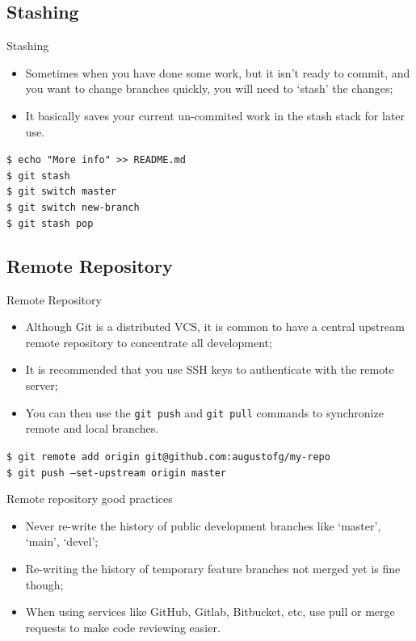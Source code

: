 \documentclass{beamer}
\begin{document}
\subsection{Stashing}
\begin{frame}{Stashing}
  \begin{itemize}
    \item Sometimes when you have done some work, but it isn't ready to commit, and you want to change branches quickly, you will need to `stash' the changes;
    \item It basically saves your current un-commited work in the stash stack for later use.
  \end{itemize}
  \begin{block}{}
    \texttt{\$ echo "More info" >> README.md} \\
    \texttt{\$ git stash} \\
    \texttt{\$ git switch master} \\
    \texttt{\$ git switch new-branch} \\
    \texttt{\$ git stash pop}
  \end{block}
\end{frame}

\subsection{Remote Repository}
\begin{frame}{Remote Repository}
  \begin{itemize}
    \item Although Git is a distributed VCS, it is common to have a central upstream remote repository to concentrate all development;
    \item It is recommended that you use SSH keys to authenticate with the remote server;
    \item You can then use the \texttt{git push} and \texttt{git pull} commands to synchronize remote and local branches.
  \end{itemize}
  \begin{block}{}
    \texttt{\$ git remote add origin git@github.com:augustofg/my-repo} \\
    \texttt{\$ git push --set-upstream origin master}
  \end{block}
\end{frame}

\begin{frame}{Remote repository good practices}
  \begin{itemize}
    \item Never re-write the history of public development branches like `master', `main', `devel';
    \item Re-writing the history of temporary feature branches not merged yet is fine though;
    \item When using services like GitHub, Gitlab, Bitbucket, etc, use pull or merge requests to make code reviewing easier.
  \end{itemize}
\end{frame}
\end{document}
